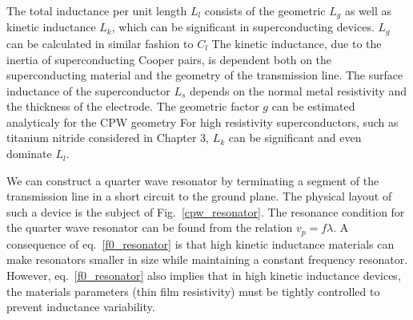 The total inductance per unit length $L_l$ consists of the geometric $L_g$ as well as kinetic inductance $L_k$,
which can be significant in superconducting devices.
$L_g$ can be calculated in similar fashion to $C_l$ \cite{GaoThesis}
The kinetic inductance, due to the inertia of superconducting Cooper pairs, is dependent both on the superconducting material and the geometry of the transmission line.
The surface inductance of the superconductor $L_s$ depends on the normal metal resistivity and the thickness of the electrode. \cite{KherThesis}
The geometric factor $g$ can be estimated analyticaly for the CPW geometry \cite{RamiThesis, GaoThesis}
For high resistivity superconductors, such as titanium nitride considered in Chapter 3, $L_k$ can be significant and even dominate $L_l$.


We can construct a quarter wave resonator by terminating a segment of the transmission line in a short circuit to the ground plane.
The physical layout of such a device is the subject of Fig.~\ref{cpw_resonator}.
The resonance condition for the quarter wave resonator can be found from the relation $v_p = f \lambda$.
A consequence of eq.~\ref{f0_resonator} is that high kinetic inductance materials can make resonators smaller in size while maintaining a constant frequency resonator.
However, eq.~\ref{f0_resonator} also implies that in high kinetic inductance devices,
the materials parameters (thin film resistivity) must be tightly controlled to prevent inductance variability.

